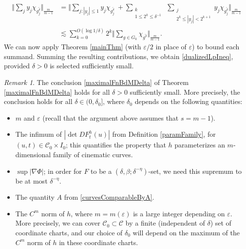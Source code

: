 \documentclass[letterpaper, reqno,11pt]{article}
\numberwithin{equation}{section}
\newcommand{\eps}{\varepsilon}
\numberwithin{thm}{section}
\theoremstyle{remark}
\newtheorem{rem}[thm]{Remark}
\begin{document}
\begin{equation}
\begin{split}
\Big\Vert \sum_j y_j\chi_{g_j^{\tilde\delta}} \Big\Vert_{\frac{m}{m-1}}
& = \Big\Vert\sum_{j\colon |y_j|\leq 1} y_j\chi_{g_j^{\tilde\delta}}\ + \!\!\sum_{\substack{k\\ 1 \leq 2^k\leq \delta^{-1}}}\ \sum_{\substack{j\\ 2^k\leq |y_j|<2^{k+1}}} y_j\chi_{g_j^{\tilde\delta}} \Big\Vert_{\frac{m}{m-1}}\\
&\lesssim \sum_{k=0}^{O(\log 1/\delta)} 2^{k} \Big\Vert \sum_{g\in G_k} \chi_{g^{\tilde\delta}} \Big\Vert_{\frac{m}{m-1}}.
\end{split}
\end{equation}
We can now apply Theorem \ref{mainThm} (with $\eps/2$ in place of $\eps$) to bound each summand. Summing the resulting contributions, we obtain \eqref{dualizedLpIneq},  provided $\delta>0$ is selected sufficiently small.


\begin{rem}\label{dependenceOnDeltaRemark}
The conclusion \eqref{maximalFnBdMDelta} of Theorem \ref{maximalFnBdMDelta} holds for all $\delta>0$ sufficiently small. More precisely, the conclusion holds for all $\delta\in (0,\delta_0]$, where $\delta_0$ depends on the following quantities:
\begin{itemize}
\item $m$ and $\eps$ (recall that the argument above assumes that $s = m-1$).

\item The infimum of $|\det DF^h_t(u)|$ from Definition \ref{paramFamily}, for $(u,t)\in \mathcal{C}_0\times I_0$; this quantifies the property that $h$ parameterizes an $m$-dimensional family of cinematic curves.


\item $\sup|\nabla \Phi|$; in order for $F$ to be a $(\delta, \beta; \delta^{-\eta})$-set, we need this supremum to be at most $\delta^{-\eta}$. 

\item The quantity $A$ from \eqref{curvesComparableByA}.

\item The $C^m$ norm of $h$, where $m=m(\eps)$ is a large integer depending on $\eps$. More precisely, we can cover $\mathcal{C}_0\subset\mathcal{C}$ by a finite (independent of $\delta$) set of coordinate charts, and our choice of $\delta_0$ will depend on the maximum of the $C^m$ norm of $h$ in these coordinate charts. 
\end{itemize}
\end{rem}
\end{document}
